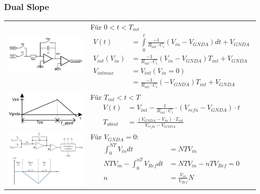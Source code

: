 \subsubsection{Dual Slope }
\begin{longtable}{cp{12cm}}
 \includegraphics[width=6cm, valign=t]{pictures/dualSlope11}
 & 
 {Für $0<t<T_{int}$
 \begin{align*}
      V(t)&=
      \int\limits_0^{t}\frac{-1}{R_{int}
      \cdot C_{i}}(V_{in}-V_{GNDA})dt+V_{GNDA}\\
      V_{int}(V_{in})&=\frac{-1}{R_{int}
      \cdot C_{i}}(V_{in}-V_{GNDA})T_{int}+V_{GNDA}\\
      V_{intmax}&=V_{int}(V_{in}=0)\\
                &=\frac{-1}{R_{int}
      \cdot C_{i}}(-V_{GNDA})T_{int}+V_{GNDA}
 \end{align*}} \\
 
 \includegraphics[width=6cm, valign=t]{pictures/dualSlope12}
 &  
 {Für $T_{int}<t<T$
 \begin{align*}
  V(t)&=V_{int}-\frac{1}{R_{int}\cdot C_{i}}\cdot
  (V_{refn}-V_{GNDA}) \cdot t\\
   T_{abint}&=\frac{(V_{GNDA}-V_{in}) \cdot T_{int}}{V_{refn}-V_{GNDA}}
 \end{align*}}\\
 
 \includegraphics[width=6cm, valign=t]{pictures/dualSlope2}
 &  
 {Für $V_{GNDA}=0$:
  \begin{align*}
    \int^{NT}_{0}V_{in}dt&=NTV_{in}\\
      NTV_{in}-\int^{nT}_{0}V_{Ref}dt&=NTV_{in}-nTV_{Ref}=0\\
      n&=\frac{V_{in}}{V_{Ref}}N\\
  \end{align*}}\\
  

\end{longtable}
